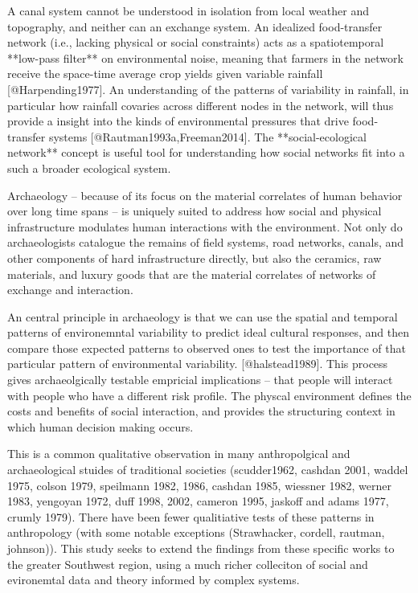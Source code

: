 \documentclass[fleqn,10pt]{wlscirep}
\begin{document}
A canal system cannot be understood in isolation from local weather and topography, and neither can an exchange system. An idealized food-transfer network (i.e., lacking physical or social constraints) acts as a spatiotemporal **low-pass filter** on environmental noise, meaning that farmers in the network receive the space-time average crop yields given variable rainfall [@Harpending1977]. An understanding of the patterns of variability in rainfall, in particular how rainfall covaries across different nodes in the network, will thus provide a insight into the kinds of environmental pressures that drive food-transfer systems [@Rautman1993a,Freeman2014]. The **social-ecological network** concept is useful tool for understanding how social networks fit into a such a broader ecological system.





Archaeology -- because of its focus on the material correlates of human behavior over long time spans -- is uniquely suited to address how social and physical infrastructure modulates human interactions with the environment. Not only do archaeologists catalogue the remains of field systems, road networks, canals, and other components of hard infrastructure directly, but also the ceramics, raw materials, and luxury goods that are the material correlates of networks of exchange and interaction.

An central principle in archaeology is that we can use the spatial and temporal patterns of environemntal variability to predict ideal cultural responses, and then compare those expected patterns to observed ones to test the importance of that particular pattern of environmental variability. [@halstead1989]. This process gives archaeolgically testable empricial implications -- that people will interact with people who have a different risk profile. The physcal environment defines the costs and benefits of social interaction, and provides the structuring context in which human decision making occurs.

This is a common qualitative observation in many anthropolgical and archaeological stuides of traditional societies (scudder1962, cashdan 2001, waddel 1975, colson 1979, speilmann 1982, 1986, cashdan 1985, wiessner 1982, werner 1983, yengoyan 1972, duff 1998, 2002, cameron 1995, jaskoff and adams 1977, crumly 1979).
There have been fewer qualitiative tests of these patterns in anthropology (with some notable exceptions (Strawhacker, cordell, rautman, johnson)). This study seeks to extend the findings from these specific works to the greater Southwest region, using a much richer colleciton of social and evironemtal data and theory informed by complex systems.
\end{document}
